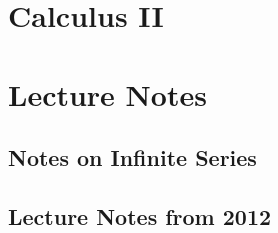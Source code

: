 \documentclass[crop=false,class=article,oneside]{standalone}
\begin{document}
    \ifx\ifmathcoursescalculusII\undefined
        \section*{Calculus II}
        \setcounter{section}{1}
    \else
        \section{Lecture Notes}
    \fi
    \subsection{Notes on Infinite Series}
    \subsection{Lecture Notes from 2012}
\end{document}
